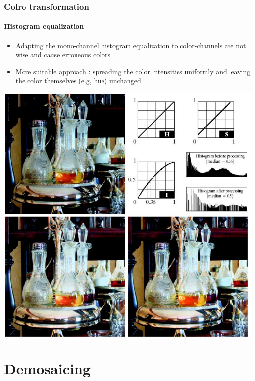 \documentclass{beamer}
\begin{document}
\begin{frame}
\frametitle{Colro transformation}
\framesubtitle{Histogram equalization}
\footnotesize{
\begin{itemize}
\item Adapting the mono-channel histogram equalization to color-channels are not wise and cause erroneous colors
\item More suitable approach : spreading the color intensities uniformly and leaving the color themselves (e.g, hue) unchanged 
\end{itemize}
}
\begin{center}
\includegraphics[scale=0.23]{images/L6_ex_HE_color.png}
\end{center}
\end{frame}
\section{Demosaicing}

\end{document}
